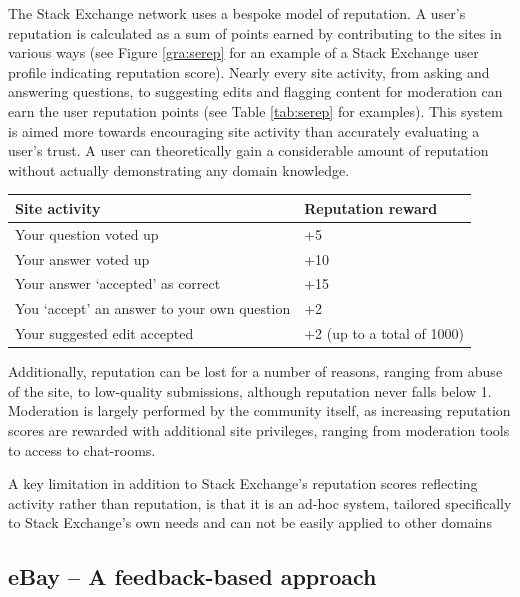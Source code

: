 \documentclass[]{final_report}
\begin{document}
The Stack Exchange network uses a bespoke model of reputation. A user's reputation is calculated as a sum of points earned by contributing to the sites in various ways (see Figure \ref{gra:serep} for an example of a Stack Exchange user profile indicating reputation score). Nearly every site activity, from asking and answering questions, to suggesting edits and flagging content for moderation can earn the user reputation points (see Table \ref{tab:serep} for examples). This system is aimed more towards encouraging site activity than accurately evaluating a user's trust. A user can theoretically gain a considerable amount of reputation without actually demonstrating any domain knowledge.

\begin{minipage}{\linewidth}
\centering
\begin{tabular}{|l|l|}
\hline \textbf{Site activity} & \textbf{Reputation reward} \\ 
\hline Your question voted up & +5 \\ 
\hline Your answer voted up & +10 \\ 
\hline Your answer `accepted' as correct & +15 \\ 
\hline You `accept' an answer to your own question & +2 \\ 
\hline Your suggested edit accepted & +2 (up to a total of 1000) \\ 
\hline 
\end{tabular}\par
{} 
\label{tab:serep}
\end{minipage}


Additionally, reputation can be lost for a number of reasons, ranging from abuse of the site, to low-quality submissions, although reputation never falls below 1. Moderation is largely performed by the community itself, as increasing reputation scores are rewarded with additional site privileges, ranging from moderation tools to access to chat-rooms.

A key limitation in addition to Stack Exchange's reputation scores reflecting activity rather than reputation, is that it is an ad-hoc system, tailored specifically to Stack Exchange's own needs and can not be easily applied to other domains

\subsection{eBay -- A feedback-based approach}
\end{document}
